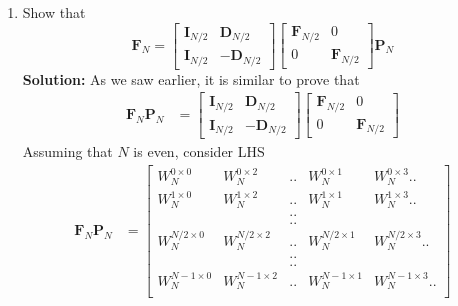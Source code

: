 \documentclass[journal,12pt,twocolumn]{IEEEtran}
\newcommand{\solution}{\noindent \textbf{Solution: }}
\let\vec\mathbf
\numberwithin{equation}{section}
\renewcommand\thesection{\arabic{section}}
\begin{document}
\begin{enumerate}[label=\arabic*.,ref=\thesection.\theenumi]
\item Show that 
\begin{equation}
\vec{F}_{N}=
\begin{bmatrix}
\vec{I}_{N/2} & \vec{D}_{N/2} \\
\vec{I}_{N/2} & -\vec{D}_{N/2}
\end{bmatrix}
\begin{bmatrix}
\vec{F}_{N/2} & 0 \\
0 & \vec{F}_{N/2}
\end{bmatrix}
\vec{P}_{N}
\end{equation}
\solution As we saw earlier, it is similar to prove that
 \begin{align}
 	\vec{F}_{N}\vec{P}_{N} &= \begin{bmatrix}
 		                      \vec{I}_{N/2} & \vec{D}_{N/2} \\
 		                      \vec{I}_{N/2} & \vec{-D}_{N/2}
 	                          \end{bmatrix}
                              \begin{bmatrix}
                              	\vec{F}_{N/2} &  0 \\
                              	 0             & \vec{F}_{N/2}
                            \end{bmatrix}
 \end{align}
Assuming that $N$ is even, consider LHS
 \begin{align}
 	\vec{F}_{N}\vec{P}_{N} &= \begin{bmatrix}
 		                          W_{N}^{0 \times 0} & W_{N}^{0 \times 2} & ..& W_{N}^{0 \times 1} & W_{N}^{0 \times 3} .. \\
 		                           W_{N}^{1 \times 0} & W_{N}^{1 \times 2 } &..& W_{N}^{1 \times 1} & W_{N}^{1 \times 3} .. \\
 		                          & & ..&&  \\
 		                          & & ..&& \\
 		                          W_{N}^{N/2 \times 0} & W_{N}^{N/2 \times 2 } & ..& W_{N}^{N/2 \times 1} & W_{N}^{N/2 \times 3}..  \\
                                  & & ..&& \\
                                  && ..&&\\
                                  W_{N}^{N-1 \times 0} & W_{N}^{N-1 \times 2 } & .. & W_{N}^{N-1 \times 1} & W_{N}^{N-1 \times 3}..  \\ 
 		                      \end{bmatrix}

\end{align}
\end{enumerate}
\end{document}
